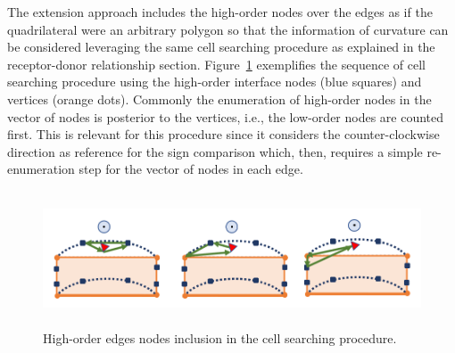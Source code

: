 The extension approach includes the high-order nodes over the edges as if the quadrilateral were an arbitrary polygon so that the information of curvature can be considered leveraging the same cell searching procedure as explained in the receptor-donor relationship section. Figure\ \ref{fig:high_order_mesh_extension} exemplifies the sequence of cell searching procedure using the high-order interface nodes (blue squares) and vertices (orange dots). Commonly the enumeration of high-order nodes in the vector of nodes is posterior to the vertices, i.e., the low-order nodes are counted first. This is relevant for this procedure since it considers the counter-clockwise direction as reference for the sign comparison which, then, requires a simple re-enumeration step for the vector of nodes in each edge.
%
\begin{figure}[H]
	\centering
	\includegraphics[height=4.0cm]{figs/overset/high_order_extension.png}
    \caption{High-order edges nodes inclusion in the cell searching procedure.}
    \label{fig:high_order_mesh_extension}
\end{figure}

